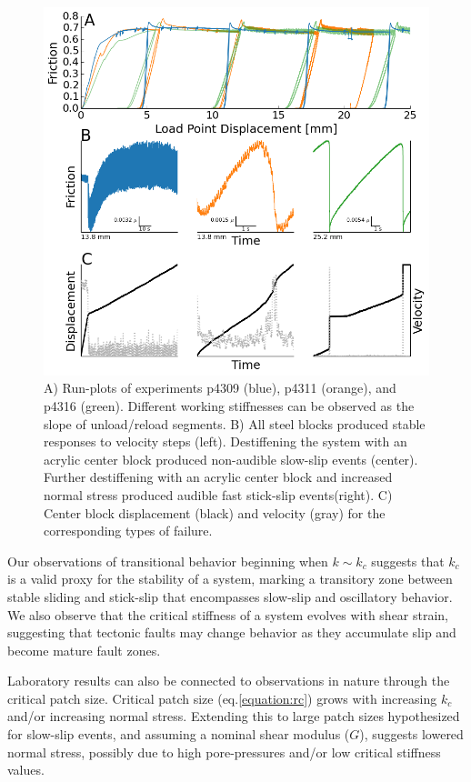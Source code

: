 \documentclass[11pt]{article}
\begin{document}
\begin{figure}
	\centering
		\includegraphics[scale=0.7]{../Figures/Fig_Runplot/runplot.png}
   	\caption{A) Run-plots of experiments p4309 (blue), p4311 (orange), and p4316
   	(green). Different working stiffnesses can be observed as the slope of
   	unload/reload segments. B) All steel blocks produced stable responses to
   	velocity steps (left). Destiffening the system with an acrylic center block
   	produced non-audible slow-slip events (center). Further destiffening with an
   	acrylic center block and increased normal stress produced audible fast
   	stick-slip events(right). C) Center block displacement (black) and velocity
   	(gray) for the corresponding types of failure.}
  	\label{Figure:Runplot}
\end{figure}

Our observations of transitional behavior beginning when $k \sim k_c$ suggests
that $k_c$ is a valid proxy for the stability of a system, marking a transitory
zone between stable sliding and stick-slip that encompasses slow-slip and
oscillatory behavior. We also observe that the critical stiffness of a system
evolves with shear strain, suggesting that tectonic faults may change behavior
as they accumulate slip and become mature fault zones.

Laboratory results can also be connected to observations in nature through the
critical patch size. Critical patch size (eq.\ref{equation:rc}) grows with
increasing $k_c$ and/or increasing normal stress. Extending this to large patch
sizes hypothesized for slow-slip events, and assuming a nominal shear modulus
($G$), suggests lowered normal stress, possibly due to high pore-pressures
and/or low critical stiffness values.
\end{document}
